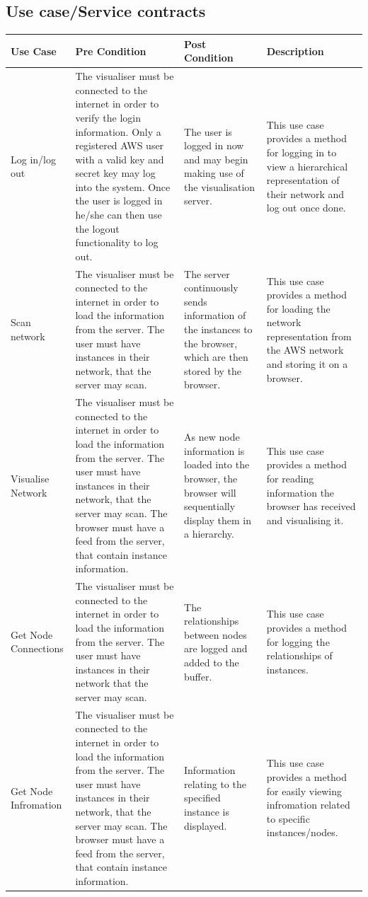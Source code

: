 \documentclass[a4paper,12pt]{report}
\begin{document}
\subsection{Use case/Service contracts}
\begin{center}
  \begin{longtable}{| p{3cm} | p{4cm} | p{4cm} | p{4cm} |}
    \hline
    Use Case & Pre Condition & Post Condition & Description \\ 
    \hline \hline
    Log in/log out & The visualiser must be connected to the internet in order to verify the login information. Only a registered AWS user with a valid key and secret key may log into the system. Once the user is logged in he/she can then use the logout functionality to log out. & The user is logged in now and may begin making use of the visualisation server. & This use case provides a method for logging in to view a hierarchical representation of their network and log out once done.\\ 
    \hline
    Scan network & The visualiser must be connected to the internet in order to load the information from the server. The user must have instances in their network, that the server may scan. & The server continuously sends information of the instances to the browser, which are then stored by the browser. & This use case provides a method for loading the network representation from the AWS network and storing it on a browser. \\ 
    \hline
    Visualise Network &  The visualiser must be connected to the internet in order to load the information from the server. The user must have instances in their network, that the server may scan. The browser must have a feed from the server, that contain instance information. & As new node information is loaded into the browser, the browser will sequentially display them in a hierarchy.  &  This use case provides a method for reading information the browser has received and visualising it.\\ 
    \hline
    
    Get Node Connections &  The visualiser must be connected to the internet in order to load the information from the server. The user must have instances in their network that the server may scan.& The relationships between nodes are logged and added to the buffer.  &  This use case provides a method for logging the relationships of instances.\\ 
    \hline
     Get Node Infromation &  The visualiser must be connected to the internet in order to load the information from the server. The user must have instances in their network, that the server may scan. The browser must have a feed from the server, that contain instance information. & Information relating to the specified instance is displayed.  &   This use case provides a method for easily viewing infromation related to specific instances/nodes.\\ 
    \hline
    

\end{longtable}
\end{center}
\end{document}
